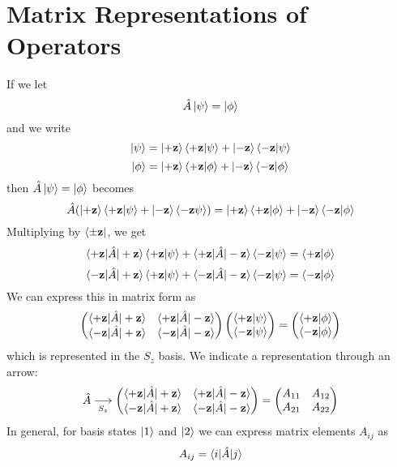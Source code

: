 \documentclass{report}
\begin{document}
\section{Matrix Representations of Operators}
If we let 
\[
\hat A \ket{\psi} = \ket{\phi}
\] 
and we write 
\[
\ket{\psi} = \ket{+ \mathbf z} \braket{+ \mathbf z | \psi} + \ket{- \mathbf z} \braket{- \mathbf z | \psi}
\] 
\[
\ket{\phi} = \ket{+ \mathbf z} \braket{+ \mathbf z | \phi} + \ket{- \mathbf z}\braket{- \mathbf z | \phi}
\] 
then \(\hat A \ket{\psi} = \ket{\phi}\) becomes
\[
\hat A ( \ket{+ \mathbf z} \braket{+ \mathbf z | \psi} + \ket{- \mathbf z} \braket{- \mathbf z \psi}) = \ket{+ \mathbf z} \braket{+ \mathbf z | \phi} + \ket{- \mathbf z} \braket{- \mathbf z | \phi}
\] 
Multiplying by \(\bra{ \pm \mathbf z}\), we get
\[
\braket{+ \mathbf z | \hat A | + \mathbf z}\braket{+ \mathbf z | \psi} + \braket{+ \mathbf z | \hat A | - \mathbf z}\braket{- \mathbf z | \psi} = \braket{+ \mathbf z | \phi}
\] 
\[
\braket{- \mathbf z | \hat A | + \mathbf z}\braket{+ \mathbf z | \psi} + \braket{- \mathbf z | \hat A | - \mathbf z}\braket{- \mathbf z | \psi} = \braket{- \mathbf z | \phi}
\] 
We can express this in matrix form as
\[
	\begin{pmatrix} \braket{+ \mathbf z | \hat A | + \mathbf z} & \braket{+ \mathbf z| \hat A| - \mathbf z} \\ \braket{- \mathbf z| \hat A| + \mathbf z} & \braket{- \mathbf z | \hat A | - \mathbf z} \end{pmatrix} \begin{pmatrix} \braket{+ \mathbf z | \psi} \\ \braket{- \mathbf z | \psi} \end{pmatrix} = \begin{pmatrix} \braket{+ \mathbf z | \phi} \\ \braket{- \mathbf z | \phi} \end{pmatrix} 
\] 
which is represented in the \(S_z\) basis. We indicate a representation through an arrow:
\[
	\hat A \underset{S_z}\longrightarrow \begin{pmatrix} \braket{+ \mathbf z| \hat A | + \mathbf z} & \braket{+\mathbf z |\hat A| - \mathbf z}\\ \braket{- \mathbf z| \hat A| + \mathbf z} & \braket{- \mathbf z | \hat A| - \mathbf z} \end{pmatrix} = \begin{pmatrix} A_{11} & A_{12} \\ A_{21} & A_{22} \end{pmatrix} 
\] 
In general, for basis states \(\ket{1}\) and \(\ket{2}\) we can express matrix elements \(A_{ij}\) as
\[
A_{ij} = \braket{i | \hat A |j}
\] 
\end{document}

